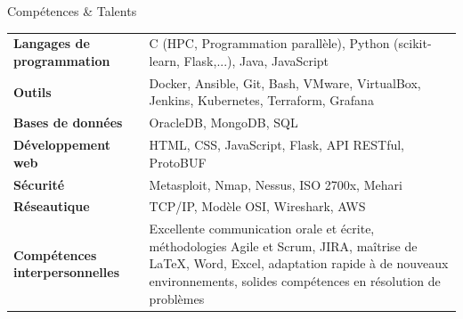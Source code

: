 \documentclass{resume}
\begin{document}
\begin{rSection}{Compétences \& Talents}
    \begin{tabularx}{\textwidth}{ @{} >{\bfseries}l @{\hspace{3ex}} X @{} }
    Langages de programmation & C (HPC, Programmation parallèle), Python (scikit-learn, Flask,...), Java, JavaScript \\
    
    Outils & Docker, Ansible, Git, Bash, VMware, VirtualBox, Jenkins, Kubernetes, Terraform, Grafana\\
    
    Bases de données & OracleDB, MongoDB, SQL \\
    
    Développement web & HTML, CSS, JavaScript, Flask, API RESTful, ProtoBUF \\
    
    Sécurité & Metasploit, Nmap, Nessus, ISO 2700x, Mehari\\
    
    Réseautique & TCP/IP, Modèle OSI, Wireshark, AWS\\
    
    Compétences interpersonnelles & Excellente communication orale et écrite, méthodologies Agile et Scrum, JIRA, maîtrise de LaTeX, Word, Excel, adaptation rapide à de nouveaux environnements, solides compétences en résolution de problèmes \\
    
    \end{tabularx}
\end{rSection}

\end{document}
